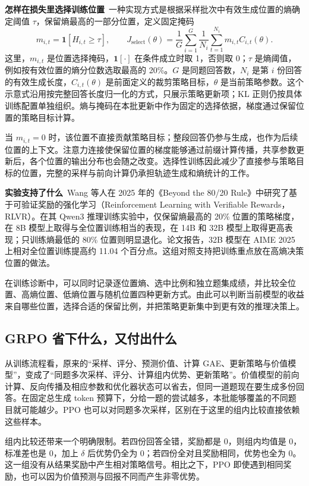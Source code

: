 \textbf{怎样在损失里选择训练位置}~一种实现方式是根据采样批次中有效生成位置的熵确定阈值 $\tau$，保留熵最高的一部分位置，定义固定掩码
\[
m_{i,t}=\mathbf 1[H_{i,t}\geq\tau],\qquad
J_{\mathrm{select}}(\theta)=
\frac1G\sum_{i=1}^{G}\frac1{N_i}
\sum_{t=1}^{N_i}m_{i,t}C_{i,t}(\theta).
\]
这里，$m_{i,t}$ 是位置选择掩码，$\mathbf 1[\cdot]$ 在条件成立时取 1，否则取 0；$\tau$ 是熵阈值，例如按有效位置的熵分位数选取最高的 20\%。$G$ 是同题回答数，$N_i$ 是第 $i$ 份回答的有效生成长度，$C_{i,t}(\theta)$ 是前面定义的裁剪策略目标，$\theta$ 是当前策略参数。这个示意式沿用按完整回答长度归一化的方式，只展示策略更新项；KL 正则仍按具体训练配置单独组织。熵与掩码在本批更新中作为固定的选择依据，梯度通过保留位置的策略目标计算。

当 $m_{i,t}=0$ 时，该位置不直接贡献策略目标；整段回答仍参与生成，也作为后续位置的上下文。注意力连接使保留位置的梯度能够通过前缀计算传播，共享参数更新后，各个位置的输出分布也会随之改变。选择性训练因此减少了直接参与策略目标的位置，完整的采样与前向计算仍承担轨迹生成和熵统计的工作。

\textbf{实验支持了什么}~Wang 等人在 2025 年的《Beyond the 80/20 Rule》中研究了基于可验证奖励的强化学习（Reinforcement Learning with Verifiable Rewards，RLVR）。在其 Qwen3 推理训练实验中，仅保留熵最高的 20\% 位置的策略梯度，在 8B 模型上取得与全位置训练相当的表现，在 14B 和 32B 模型上取得更高表现；只训练熵最低的 80\% 位置则明显退化。论文报告，32B 模型在 AIME 2025 上相对全位置训练提高约 11.04 个百分点。这组对照支持把训练重点放在高熵决策位置的做法。

在训练诊断中，可以同时记录逐位置熵、选中比例和独立题集成绩，并比较全位置、高熵位置、低熵位置与随机位置四种更新方式。由此可以判断当前模型的收益来自哪些位置，选择合适的保留比例，并把策略更新集中到更有效的推理决策上。

\subsection{GRPO 省下什么，又付出什么}

从训练流程看，原来的``采样、评分、预测价值、计算 GAE、更新策略与价值模型''，变成了``同题多次采样、评分、计算组内优势、更新策略''。价值模型的前向计算、反向传播及相应参数和优化器状态可以省去，但同一道题现在要生成多份回答。在固定总生成 token 预算下，分给一题的尝试越多，本批能够覆盖的不同题目就可能越少。PPO 也可以对同题多次采样，区别在于这里的组内比较直接依赖这些样本。

组内比较还带来一个明确限制。若四份回答全错，奖励都是 0，则组内均值是 0，标准差也是 0，加上 $\delta$ 后优势仍全为 0；若四份全对且奖励相同，优势也全为 0。这一组没有从结果奖励中产生相对策略信号。相比之下，PPO 即使遇到相同奖励，也可以因为价值预测与回报不同而产生非零优势。

